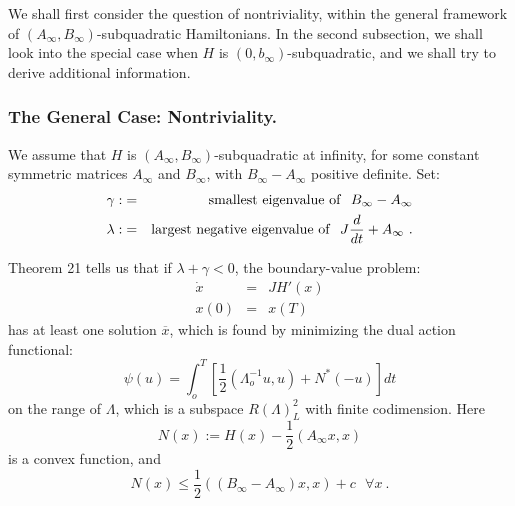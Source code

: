 We shall first consider the question of nontriviality, within the
general framework of
$\left(A_{\infty},B_{\infty}\right)$-subquadratic Hamiltonians. In
the second subsection, we shall look into the special case when $H$ is
$\left(0,b_{\infty}\right)$-subquadratic,
and we shall try to derive additional information.
%
\subsubsection{ The General Case: Nontriviality.}
%
We assume that $H$ is
$\left(A_{\infty},B_{\infty}\right)$-sub\-qua\-dra\-tic at infinity,
for some constant symmetric matrices $A_{\infty}$ and $B_{\infty}$,
with $B_{\infty}-A_{\infty}$ positive definite. Set:
\begin{eqnarray}
\gamma :&=&{\rm smallest\ eigenvalue\ of}\ \ B_{\infty} - A_{\infty} \\
  \lambda : &=& {\rm largest\ negative\ eigenvalue\ of}\ \
  J \frac{d}{dt} +A_{\infty}\ .
\end{eqnarray}

Theorem 21 tells us that if $\lambda +\gamma < 0$, the boundary-value
problem:
\begin{equation}
\begin{array}{rcl}
  \dot{x}&=&JH' (x)\\
  x(0)&=&x (T)
\end{array}
\end{equation}
has at least one solution
$\overline{x}$, which is found by minimizing the dual
action functional:
\begin{equation}
  \psi (u) = \int_{o}^{T} \left[\frac{1}{2}
  \left(\Lambda_{o}^{-1} u,u\right) + N^{\ast} (-u)\right] dt
\end{equation}
on the range of $\Lambda$, which is a subspace $R (\Lambda)_{L}^{2}$
with finite codimension. Here
\begin{equation}
  N(x) := H(x) - \frac{1}{2} \left(A_{\infty} x,x\right)
\end{equation}
is a convex function, and
\begin{equation}
  N(x) \le \frac{1}{2}
  \left(\left(B_{\infty} - A_{\infty}\right) x,x\right)
  + c\ \ \ \forall x\ .
\end{equation}

